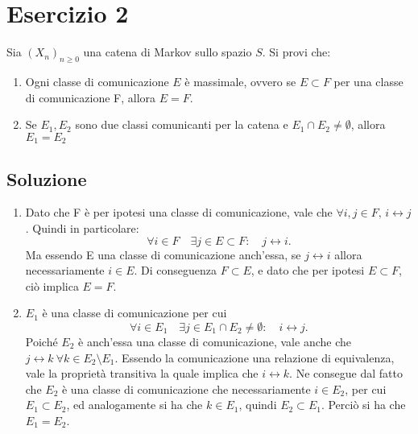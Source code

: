 \documentclass[
	12pt, %
]{fphw}
\begin{document}
\newpage
\section*{Esercizio 2}
\begin{problem}
	\smallskip
	Sia $(X_n)_{n \ge 0}$ una catena di Markov sullo spazio $S$. Si provi che:
	\begin{enumerate}
		\item Ogni classe di comunicazione $E$  è massimale, 
		ovvero se $E \subset F$ per una classe di comunicazione F, allora $E = F$.
		\item Se $E_1, E_2$ sono due classi comunicanti per la catena e
		$E_1 \cap E_2 \ne \emptyset$, allora $E_1 = E_2$
	\end{enumerate}
	\smallskip
\end{problem}
\medskip
\subsection*{Soluzione}
	\begin{enumerate}
		\item Dato che F è per ipotesi una classe di comunicazione, vale che $\forall i, j \in F\text{, }i\leftrightarrow j$.
		Quindi in particolare:
		\begin{equation*}
			\forall i \in F \quad \exists j \in E \subset F :\quad j \leftrightarrow i.
		\end{equation*}
		Ma essendo E una classe di comunicazione anch'essa, se $j\leftrightarrow i$ allora necessariamente $i \in E$.
		Di conseguenza $F\subset E$, e dato che per ipotesi $E\subset F$, ciò implica $E=F$.
		\item $E_1$ è una classe di comunicazione per cui
		\begin{equation*}
			\forall i \in E_1 \quad \exists j \in E_1 \cap E_2 \ne \emptyset : \quad i \leftrightarrow j.
		\end{equation*}
		Poiché $E_2$ è anch'essa una classe di comunicazione, vale anche che $j \leftrightarrow k ~ \forall k \in E_2 \setminus E_1$.
		Essendo la comunicazione una relazione di equivalenza, vale la proprietà transitiva la quale implica che $i \leftrightarrow k$.
		Ne consegue dal fatto che $E_2$ è una classe di comunicazione che necessariamente $i \in E_2$, per cui $E_1 \subset E_2$, ed analogamente si ha che $k \in E_1$, quindi $E_2 \subset E_1$.
		Perciò si ha che $E_1 = E_2$.
	\end{enumerate}
\end{document}
